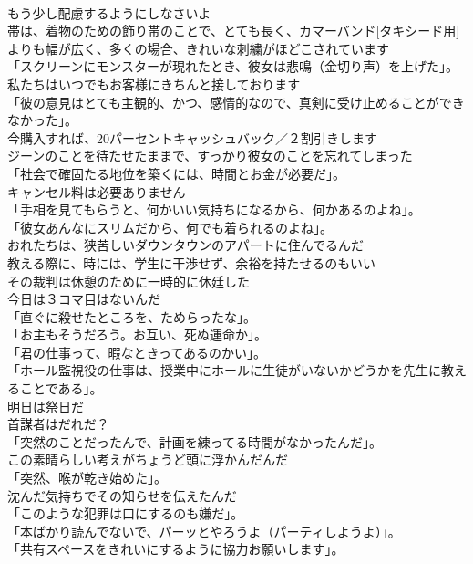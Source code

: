 \documentclass[8pt]{extreport}
\begin{document}
\begin{CJK}{UTF8}{min}
\\	もう少し配慮するようにしなさいよ	
\\	帯は、着物のための飾り帯のことで、とても長く、カマーバンド[タキシード用]よりも幅が広く、多くの場合、きれいな刺繍がほどこされています	
\\	「スクリーンにモンスターが現れたとき、彼女は悲鳴（金切り声）を上げた」。	
\\	私たちはいつでもお客様にきちんと接しております	
\\	「彼の意見はとても主観的、かつ、感情的なので、真剣に受け止めることができなかった」。	
\\	今購入すれば、20パーセントキャッシュバック／２割引きします	
\\	[電話で]ジーンのことを待たせたままで、すっかり彼女のことを忘れてしまった	
\\	「社会で確固たる地位を築くには、時間とお金が必要だ」。	
\\	キャンセル料は必要ありません	
\\	「手相を見てもらうと、何かいい気持ちになるから、何かあるのよね」。	
\\	「彼女あんなにスリムだから、何でも着られるのよね」。	
\\	おれたちは、狭苦しいダウンタウンのアパートに住んでるんだ	
\\	教える際に、時には、学生に干渉せず、余裕を持たせるのもいい	
\\	その裁判は休憩のために一時的に休廷した	
\\	今日は３コマ目はないんだ	
\\	「直ぐに殺せたところを、ためらったな」。
\\	「お主もそうだろう。お互い、死ぬ運命か」。	
\\	「君の仕事って、暇なときってあるのかい」。	
\\	「ホール監視役の仕事は、授業中にホールに生徒がいないかどうかを先生に教えることである」。	
\\	明日は祭日だ	
\\	首謀者はだれだ？	
\\	「突然のことだったんで、計画を練ってる時間がなかったんだ」。	
\\	この素晴らしい考えがちょうど頭に浮かんだんだ	
\\	「突然、喉が乾き始めた」。	
\\	沈んだ気持ちでその知らせを伝えたんだ	
\\	「このような犯罪は口にするのも嫌だ」。	
\\	「本ばかり読んでないで、パーッとやろうよ（パーティしようよ）」。	
\\	「共有スペースをきれいにするように協力お願いします」。	

\end{CJK}
\end{document}
